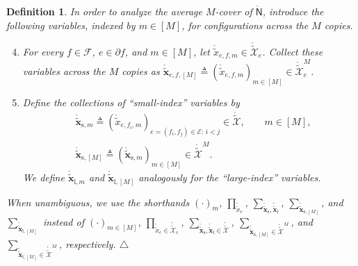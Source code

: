 \documentclass[journal]{IEEEtran}
\newcommand{\add}[1]{{\color{black}#1}}
\newtheorem{definition}[theorem]{Definition}
\newcommand{\manualendsymbol}[1]{%
  \leavevmode\unskip\penalty9999\hbox{}\nobreak\hfill
  \quad\hbox{#1}}
\newcommand{\edefinition}{\manualendsymbol{\ensuremath{\triangle}}}
\newcommand{\vect}[1]{ \bm{#1} }
\newcommand{\setEfull}{ \mathcal{E} }
\newcommand{\setF}{ \mathcal{F} }
\newcommand{\sfN}{ \mathsf{N} }
\newcommand{\setpf}{ \partial f }
\newcommand{\defeq}{ \triangleq }
\newcommand{\LCTtset}[1]{\mathring{\tilde{\mathcal{#1}}}}
\newcommand{\LCTtv}[1]{ \mathring{ \tilde{ \vect{#1} } } }
\newcommand{\LCT}[1]{ \mathring{#1} }
\newcommand{\LCTt}[1]{ \mathring{ \tilde{#1} } }
\newcommand{\ef}{ e,f }
\newcommand{\efi}{ e,f_i }
\newcommand{\LCTvxl}{ \LCTtv{x}_{\mathrm{l}} }
\newcommand{\LCTvxs}{ \LCTtv{x}_{\mathrm{s}} }
\newcommand{\LCTvxlm}{ \LCTtv{x}_{\mathrm{l},m} }
\newcommand{\LCTvxsm}{ \LCTtv{x}_{\mathrm{s},m} }
\newcommand{\LCTvxlM}{ \LCTtv{x}_{\mathrm{l},[M]} }
\newcommand{\LCTvxsM}{ \LCTtv{x}_{\mathrm{s},[M]} }
\begin{document}
\begin{appendices}
\begin{definition}
    \add{In order to analyze the average $M$-cover of $ \LCT{\sfN} $,
      introduce the following variables, indexed by $m \in [M]$, for
      configurations across the $M$ copies.}
    \begin{enumerate}
      \setcounter{enumi}{3} %
      \item \add{For every $ f \in \setF $, $ e \in \setpf $, and $ m \in [M] $,
              let $ \LCTt{x}_{\ef,m} \in \LCTtset{X}_e$. Collect these variables
              across the $M$ copies as}
            $ \LCTtv{x}_{\ef,[M]} \defeq ( \LCTt{x}_{\ef,m} )_{m \in [M]} \in
              \LCTtset{X}_{e}^{M} $.

      \item \add{Define the collections of ``small-index'' variables by}
            \begin{align*}
               & \LCTvxsm \defeq ( \LCTt{x}_{\efi,m} )_{ e = (f_{i},f_{j}) \in \setEfull:\, i <j }
              \in \LCTtset{X}, \qquad m \in [M],
              \\
               & \LCTvxsM \defeq (\LCTvxsm)_{m \in [M]} \in \LCTtset{X}^{M}.
            \end{align*}
            We define $ \LCTvxlm $ and $ \LCTvxlM $ analogously for the
            ``large-index'' variables.
    \end{enumerate}

    \add{When unambiguous, we use the shorthands $ ( \cdot )_{m} $,}
    $\prod_{\LCTt{x}_{e}}$, $ \sum_{ \LCTvxs, \LCTvxl } $,
    $ \sum_{\LCTvxsM} $, and $ \sum_{\LCTvxlM} $ \add{instead of
      $ (\cdot)_{m \in [M]} $,} $\prod_{\LCTt{x}_{e} \in \LCTtset{X}_{e}}$,
    $ \sum_{ \LCTvxs, \LCTvxl \in \LCTtset{X} } $,
    $ \sum_{\LCTvxsM \in \LCTtset{X}^{M} } $, and
    $ \sum_{\LCTvxlM \in \LCTtset{X}^{M} } $, respectively.  \edefinition
  \end{definition}


\end{appendices}
\end{document}

